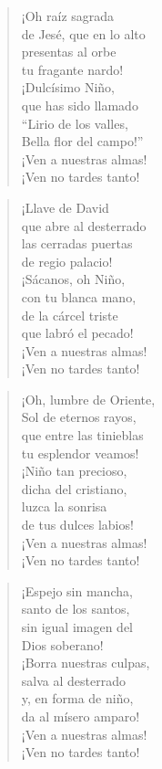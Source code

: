 \documentclass[spanish,utf8,12pt,twocolumn]{chlart}
\newenvironment{gozo}{\begin{verse}\color{lector}}{\end{verse}}
\newcommand*\vena{{\color{responden}\hspace{1em}¡Ven a nuestras almas!\\\hspace{1em}¡Ven no tardes tanto!}}
\begin{document}
\newpage
\begin{gozo}
¡Oh raíz sagrada\\
de Jesé, que en lo alto\\
presentas al orbe\\
tu fragante nardo!\\
¡Dulcísimo Niño,\\
que has sido llamado\\
“Lirio de los valles,\\
Bella flor del campo!”\\
\vena
\end{gozo}

\begin{gozo}
¡Llave de David\\
que abre al desterrado\\
las cerradas puertas\\
de regio palacio!\\
¡Sácanos, oh Niño,\\
con tu blanca mano,\\
de la cárcel triste\\
que labró el pecado!\\
\vena
\end{gozo}

\begin{gozo}
¡Oh, lumbre de Oriente,\\
Sol de eternos rayos,\\
que entre las tinieblas\\
tu esplendor veamos!\\
¡Niño tan precioso,\\
dicha del cristiano,\\
luzca la sonrisa\\
de tus dulces labios!\\
\vena
\end{gozo}

\begin{gozo}
¡Espejo sin mancha,\\
santo de los santos,\\
sin igual imagen del\\
Dios soberano!\\
¡Borra nuestras culpas,\\
salva al desterrado\\
y, en forma de niño,\\
da al mísero amparo!\\
\vena
\end{gozo}
\end{document}
